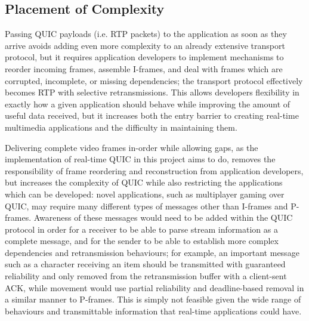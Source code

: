\documentclass{mpaper}
\begin{document}
\subsection{Placement of Complexity}
Passing QUIC payloads (i.e. RTP packets) to the application as soon as they arrive avoids adding even more complexity to an already extensive transport protocol, but it requires application developers to implement mechanisms to reorder incoming frames, assemble I-frames, and deal with frames which are corrupted, incomplete, or missing dependencies; the transport protocol effectively becomes RTP with selective retransmissions. This allows developers flexibility in exactly how a given application should behave while improving the amount of useful data received, but it increases both the entry barrier to creating real-time multimedia applications and the difficulty in maintaining them.

Delivering complete video frames in-order while allowing gaps, as the implementation of real-time QUIC in this project aims to do, removes the responsibility of frame reordering and reconstruction from application developers, but increases the complexity of QUIC while also restricting the applications which can be developed: novel applications, such as multiplayer gaming over QUIC, may require many different types of messages other than I-frames and P-frames. Awareness of these messages would need to be added within the QUIC protocol in order for a receiver to be able to parse stream information as a complete message, and for the sender to be able to establish more complex dependencies and retransmission behaviours; for example, an important message such as a character receiving an item should be transmitted with guaranteed reliability and only removed from the retransmission buffer with a client-sent ACK, while movement would use partial reliability and deadline-based removal in a similar manner to P-frames. This is simply not feasible given the wide range of behaviours and transmittable information that real-time applications could have.
\end{document}
